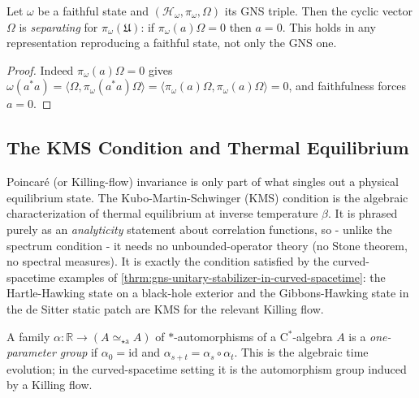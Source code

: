 \begin{theorem}
    \label{thrm:separating-faithful}
    \leanok
    Let $\omega$ be a faithful state and $(\mathcal{H}_\omega, \pi_\omega, \Omega)$ its GNS triple. Then the cyclic vector $\Omega$ is \emph{separating} for $\pi_\omega(\mathfrak{U})$: if $\pi_\omega(a)\Omega = 0$ then $a = 0$. This holds in any representation reproducing a faithful state, not only the GNS one.
\end{theorem}
\begin{proof}
    \leanok
    Indeed $\pi_\omega(a)\Omega = 0$ gives $\omega(a^* a) = \langle \Omega, \pi_\omega(a^* a)\Omega\rangle = \langle \pi_\omega(a)\Omega, \pi_\omega(a)\Omega\rangle = 0$, and faithfulness forces $a = 0$.
\end{proof}

\subsection{The KMS Condition and Thermal Equilibrium}

Poincar\'e (or Killing-flow) invariance is only part of what singles out a physical equilibrium state. The Kubo-Martin-Schwinger (KMS) condition is the algebraic characterization of thermal equilibrium at inverse temperature $\beta$. It is phrased purely as an \emph{analyticity} statement about correlation functions, so - unlike the spectrum condition - it needs no unbounded-operator theory (no Stone theorem, no spectral measures). It is exactly the condition satisfied by the curved-spacetime examples of \ref{thrm:gns-unitary-stabilizer-in-curved-spacetime}: the Hartle-Hawking state on a black-hole exterior and the Gibbons-Hawking state in the de Sitter static patch are KMS for the relevant Killing flow.

\begin{definition}
    \label{def:one-parameter-aut}
    \leanok
    A family $\alpha : \mathbb{R} \to (A \simeq_{\star\mathrm{a}} A)$ of $*$-automorphisms of a C$^*$-algebra $A$ is a \emph{one-parameter group} if $\alpha_0 = \mathrm{id}$ and $\alpha_{s+t} = \alpha_s \circ \alpha_t$. This is the algebraic time evolution; in the curved-spacetime setting it is the automorphism group induced by a Killing flow.
\end{definition}

